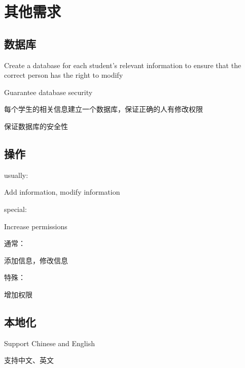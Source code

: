 \chapter{其他需求}
\section{数据库}
Create a database for each student's relevant information to ensure that the correct person has the right to modify

Guarantee database security

每个学生的相关信息建立一个数据库，保证正确的人有修改权限

保证数据库的安全性



\section{操作}
usually:

Add information, modify information

special:

Increase permissions

通常：

添加信息，修改信息

特殊：

增加权限

\section{本地化}
Support Chinese and English

支持中文、英文
